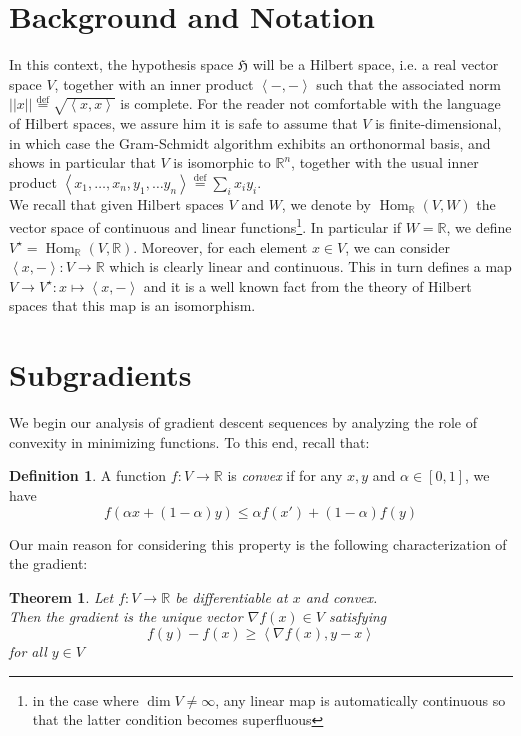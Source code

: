 \documentclass{book}
\theoremstyle{plain}
\newtheorem{theorem}[corollary]{Theorem}
\theoremstyle{definition}
\newtheorem{definition}[corollary]{Definition}
\newcommand{\bl}[2]{\left\langle #1,#2\right\rangle}
\renewcommand{\d}[1]{\mathbb{#1}}
\newcommand{\define}{\stackrel{\operatorname{def}}{=}}
\newcommand{\f}[1]{\mathfrak{#1}}
\newcommand{\norm}[1]{\vert \vert #1 \vert \vert}
\DeclareMathOperator{\Hom}{Hom}
\newcommand{\mor}{\longrightarrow}
\begin{document}
\section{Background and Notation}
In this context, the hypothesis space $\f{H}$ will be a Hilbert space, i.e. a real vector space $V$, together with an inner product $\bl{-}{-}$ such that the associated norm $\norm{x}\define \sqrt{\bl{x}{x}}$  is complete. For the reader not comfortable with the language of Hilbert spaces,  we assure him it is safe to assume that $V$ is finite-dimensional, in which case the Gram-Schmidt algorithm exhibits an orthonormal basis, and shows in particular that  $V$ is isomorphic to $\d{R}^n$, together with the usual inner product $\bl{x_1,\ldots , x_n}{y_1,\ldots y_n}\define \sum_i x_iy_i$.\\

\noindent We recall that given Hilbert spaces $V$ and $W$, we denote by $\Hom_\d{R}(V,W)$ the vector space of continuous and linear functions\footnote{in the case where $\dim V\neq \infty$, any linear map is automatically continuous so that the latter condition becomes superfluous}. In particular if $W=\d{R}$, we define $V^\star=\Hom_{\d{R}}(V,\d{R})$.  Moreover, for each element $x \in V$, we can consider $\bl{x}{-}:V\mor \d{R}$ which is clearly linear and continuous. This in turn defines a map $V\mor V^\star:x\mapsto \bl{x}{-}$ and it is a well known fact from the theory of Hilbert spaces that this map is an isomorphism.\\
\section{Subgradients}
We begin our analysis of gradient descent sequences by analyzing the role of convexity in minimizing functions. To this end, recall that:
\begin{definition}
A function $f:V\mor \d{R}$ is \emph{convex} if for any $x,y$ and $\alpha \in [0,1]$, we have
\[
f(\alpha x+(1-\alpha)y)\le \alpha f(x')+(1-\alpha)f(y)
\]	
\end{definition}

\noindent Our main reason for considering this property is the following characterization of the gradient:
\begin{theorem}\label{thm:gradient=subgradient}
Let $f:V\mor \d{R}$ be differentiable at $x$ and convex.\\
Then the gradient is the unique vector $\nabla f(x) \in V$ satisfying
\begin{equation}\label{ineq:subgradient}
f(y)-f(x)\ge \bl{\nabla f(x)}{ y-x}
\end{equation}
for all $y \in V$
\end{theorem}
\end{document}
